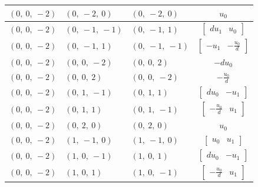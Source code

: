 \documentclass[11pt]{article}
\theoremstyle{definition}
\begin{document}
\begin{longtable}{|l|l|l|c|}
    \hline
    $\left( 0, \  0, \  -2\right)$ & $\left( 0, \  -2, \  0\right)$ & $\left( 0, \  -2, \  0\right)$ & $u_{0}$ \\
    \hline
    $\left( 0, \  0, \  -2\right)$ & $\left( 0, \  -1, \  -1\right)$ & $\left( 0, \  -1, \  1\right)$ & $\left[\begin{matrix}d u_{1} & u_{0}\end{matrix}\right]$ \\
    \hline
    $\left( 0, \  0, \  -2\right)$ & $\left( 0, \  -1, \  1\right)$ & $\left( 0, \  -1, \  -1\right)$ & $\left[\begin{matrix}- u_{1} & - \frac{u_{0}}{d}\end{matrix}\right]$ \\
    \hline
    $\left( 0, \  0, \  -2\right)$ & $\left( 0, \  0, \  -2\right)$ & $\left( 0, \  0, \  2\right)$ & $- d u_{0}$ \\
    \hline
    $\left( 0, \  0, \  -2\right)$ & $\left( 0, \  0, \  2\right)$ & $\left( 0, \  0, \  -2\right)$ & $- \frac{u_{0}}{d}$ \\
    \hline
    $\left( 0, \  0, \  -2\right)$ & $\left( 0, \  1, \  -1\right)$ & $\left( 0, \  1, \  1\right)$ & $\left[\begin{matrix}d u_{0} & - u_{1}\end{matrix}\right]$ \\
    \hline
    $\left( 0, \  0, \  -2\right)$ & $\left( 0, \  1, \  1\right)$ & $\left( 0, \  1, \  -1\right)$ & $\left[\begin{matrix}- \frac{u_{0}}{d} & u_{1}\end{matrix}\right]$ \\
    \hline
    $\left( 0, \  0, \  -2\right)$ & $\left( 0, \  2, \  0\right)$ & $\left( 0, \  2, \  0\right)$ & $u_{0}$ \\
    \hline
    $\left( 0, \  0, \  -2\right)$ & $\left( 1, \  -1, \  0\right)$ & $\left( 1, \  -1, \  0\right)$ & $\left[\begin{matrix}u_{0} & u_{1}\end{matrix}\right]$ \\
    \hline
    $\left( 0, \  0, \  -2\right)$ & $\left( 1, \  0, \  -1\right)$ & $\left( 1, \  0, \  1\right)$ & $\left[\begin{matrix}d u_{0} & - u_{1}\end{matrix}\right]$ \\
    \hline
    $\left( 0, \  0, \  -2\right)$ & $\left( 1, \  0, \  1\right)$ & $\left( 1, \  0, \  -1\right)$ & $\left[\begin{matrix}- \frac{u_{0}}{d} & u_{1}\end{matrix}\right]$ \\

\end{longtable}
\end{document}
